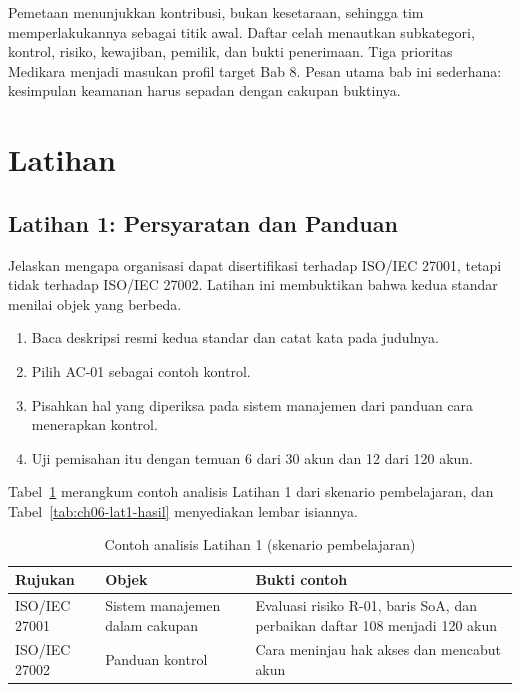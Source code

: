 Pemetaan menunjukkan kontribusi, bukan kesetaraan, sehingga tim memperlakukannya sebagai titik awal.
Daftar celah menautkan subkategori, kontrol, risiko, kewajiban, pemilik, dan bukti penerimaan. Tiga
prioritas Medikara menjadi masukan profil target Bab 8. Pesan utama bab ini sederhana: kesimpulan
keamanan harus sepadan dengan cakupan buktinya.

\section{Latihan}

\subsection*{Latihan 1: Persyaratan dan Panduan}

Jelaskan mengapa organisasi dapat disertifikasi terhadap ISO/IEC 27001, tetapi tidak terhadap ISO/IEC
27002. Latihan ini membuktikan bahwa kedua standar menilai objek yang berbeda.

\begin{enumerate}
  \item Baca deskripsi resmi kedua standar dan catat kata pada judulnya.
  \item Pilih AC-01 sebagai contoh kontrol.
  \item Pisahkan hal yang diperiksa pada sistem manajemen dari panduan cara menerapkan kontrol.
  \item Uji pemisahan itu dengan temuan 6 dari 30 akun dan 12 dari 120 akun.
\end{enumerate}

Tabel~\ref{tab:ch06-lat1-contoh} merangkum contoh analisis Latihan 1 dari skenario pembelajaran, dan
Tabel~\ref{tab:ch06-lat1-hasil} menyediakan lembar isiannya.

\begin{table}[!htb]
  \centering\small
  \caption{Contoh analisis Latihan 1 (skenario pembelajaran)}\label{tab:ch06-lat1-contoh}
  \begin{tabularx}{\textwidth}{|>{\raggedright\arraybackslash}p{}|>{\raggedright\arraybackslash}X|>{\raggedright\arraybackslash}X|}
    \hline
    \textbf{Rujukan} & \textbf{Objek} & \textbf{Bukti contoh} \\ \hline
    ISO/IEC 27001 & Sistem manajemen dalam cakupan & Evaluasi risiko R-01, baris SoA, dan perbaikan
    daftar 108 menjadi 120 akun \\ \hline
    ISO/IEC 27002 & Panduan kontrol & Cara meninjau hak akses dan mencabut akun \\ \hline
  \end{tabularx}
\end{table}

